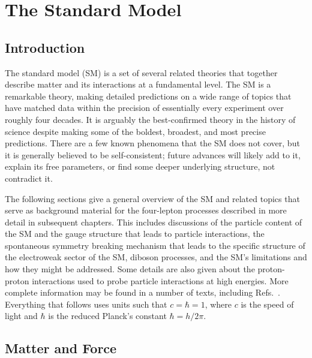 

\chapter{The Standard Model}\label{ch:SM}

\section{Introduction}

The standard model (SM) is a set of several related theories that together describe matter and its interactions at a fundamental level.
The SM is a remarkable theory, making detailed predictions on a wide range of topics that have matched data within the precision of essentially every experiment over roughly four decades.
It is arguably the best-confirmed theory in the history of science despite making some of the boldest, broadest, and most precise predictions.
There are a few known phenomena that the SM does not cover, but it is generally believed to be self-consistent; future advances will likely add to it, explain its free parameters, or find some deeper underlying structure, not contradict it.

The following sections give a general overview of the SM and related topics that serve as background material for the four-lepton processes described in more detail in subsequent chapters.
This includes discussions of the particle content of the SM and the gauge structure that leads to particle interactions, the spontaneous symmetry breaking mechanism that leads to the specific structure of the electroweak sector of the SM, diboson processes, and the SM's limitations and how they might be addressed.
Some details are also given about the proton-proton interactions used to probe particle interactions at high energies.
More complete information may be found in a number of texts, including Refs.~\cite{Griffiths:111880,Halzen:1984mc,barger1997collider,Peskin:1995ev,Donoghue:238727}.
Everything that follows uses units such that $c = \hbar = 1$, where $c$ is the speed of light and $\hbar$ is the reduced Planck's constant $\hbar = h / 2\pi$.



\section{Matter and Force}

